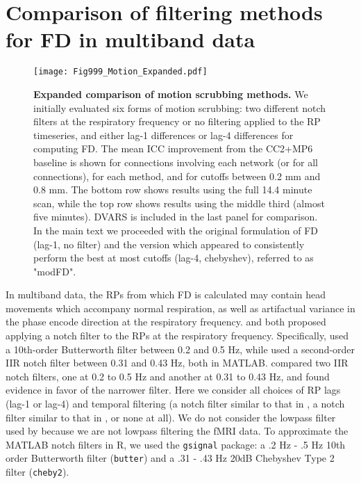 \documentclass{article}
\begin{document}

\newpage
\section{Comparison of filtering methods for FD in multiband data}
\label{app:filteredFD}

\begin{figure}
    \centering
    \texttt{[image: Fig999\_Motion\_Expanded.pdf]}
    \caption{\small \textbf{Expanded comparison of motion scrubbing methods.} We initially evaluated six forms of motion scrubbing: two different notch filters at the respiratory frequency or no filtering applied to the RP timeseries, and either lag-1 differences or lag-4 differences for computing FD. The mean ICC improvement from the CC2+MP6 baseline is shown for connections involving each network (or for all connections), for each method, and for cutoffs between 0.2 mm and 0.8 mm. The bottom row shows results using the full 14.4 minute scan, while the top row shows results using the middle third (almost five minutes). DVARS is included in the last panel for comparison. In the main text we proceeded with the original formulation of FD (lag-1, no filter) and the version which appeared to consistently perform the best at most cutoffs (lag-4, chebyshev), referred to as "modFD".}
    \label{app:fig:MotionExpanded}
\end{figure}

In multiband data, the RPs from which FD is calculated may contain head movements which accompany normal respiration, as well as artifactual variance in the phase encode direction at the respiratory frequency. \cite{power2019distinctions} and \cite{fairCorrectionRespiratoryArtifacts2020} both proposed applying a notch filter to the RPs at the respiratory frequency. Specifically, \cite{power2019distinctions} used a 10th-order Butterworth filter between 0.2 and 0.5 Hz, while \cite{fairCorrectionRespiratoryArtifacts2020} used a second-order IIR notch filter between 0.31 and 0.43 Hz, both in MATLAB. \cite{williams2022advancing} compared two IIR notch filters, one at 0.2 to 0.5 Hz and another at 0.31 to 0.43 Hz, and found evidence in favor of the narrower filter. Here we consider all choices of RP lags (lag-1 or lag-4) and temporal filtering (a notch filter similar to that in \cite{power2019distinctions}, a notch filter similar to that in \cite{fairCorrectionRespiratoryArtifacts2020}, or none at all). We do not consider the lowpass filter used by \cite{williams2022advancing} because we are not lowpass filtering the fMRI data. To approximate the MATLAB notch filters in R, we used the \texttt{gsignal} package: a .2 Hz - .5 Hz 10th order Butterworth filter (\texttt{butter}) and a .31 - .43 Hz 20dB Chebyshev Type 2 filter (\texttt{cheby2}).  %
\end{document}
